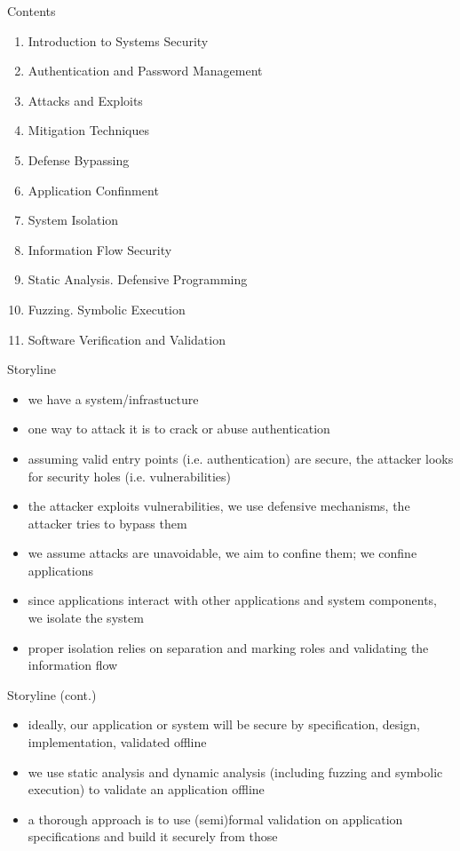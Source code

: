 \documentclass{curs}
\begin{document}
\begin{frame}{Contents}
  \begin{enumerate}
    \item Introduction to Systems Security
    \item Authentication and Password Management
    \item Attacks and Exploits
    \item Mitigation Techniques
    \item Defense Bypassing
    \item Application Confinment
    \item System Isolation
    \item Information Flow Security
    \item Static Analysis. Defensive Programming
    \item Fuzzing. Symbolic Execution
    \item Software Verification and Validation
  \end{enumerate}
\end{frame}

\begin{frame}{Storyline}
  \begin{itemize}
    \item we have a system/infrastucture
    \item one way to attack it is to crack or abuse authentication
    \item assuming valid entry points (i.e. authentication) are secure, the attacker looks for security holes (i.e. vulnerabilities)
    \item the attacker exploits vulnerabilities, we use defensive mechanisms, the attacker tries to bypass them
    \item we assume attacks are unavoidable, we aim to confine them; we confine applications
    \item since applications interact with other applications and system components, we isolate the system
    \item proper isolation relies on separation and marking roles and validating the information flow
  \end{itemize}
\end{frame}

\begin{frame}{Storyline (cont.)}
  \begin{itemize}
    \item ideally, our application or system will be secure by specification, design, implementation, validated offline
    \item we use static analysis and dynamic analysis (including fuzzing and symbolic execution) to validate an application offline
    \item a thorough approach is to use (semi)formal validation on application specifications and build it securely from those
  \end{itemize}
\end{frame}
\end{document}
